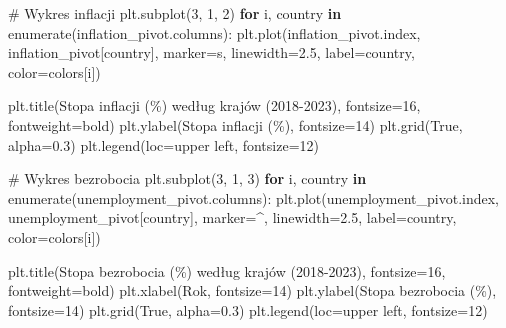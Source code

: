 \documentclass[
  polish,
  letterpaper,
  DIV=11,
  numbers=noendperiod]{scrreprt}
\newenvironment{Shaded}{\begin{snugshade}}{\end{snugshade}}
\newcommand{\BuiltInTok}[1]{\textcolor[rgb]{0.00,0.23,0.31}{#1}}
\newcommand{\CommentTok}[1]{\textcolor[rgb]{0.37,0.37,0.37}{#1}}
\newcommand{\ControlFlowTok}[1]{\textcolor[rgb]{0.00,0.23,0.31}{\textbf{#1}}}
\newcommand{\DecValTok}[1]{\textcolor[rgb]{0.68,0.00,0.00}{#1}}
\newcommand{\FloatTok}[1]{\textcolor[rgb]{0.68,0.00,0.00}{#1}}
\newcommand{\KeywordTok}[1]{\textcolor[rgb]{0.00,0.23,0.31}{\textbf{#1}}}
\newcommand{\NormalTok}[1]{\textcolor[rgb]{0.00,0.23,0.31}{#1}}
\newcommand{\OperatorTok}[1]{\textcolor[rgb]{0.37,0.37,0.37}{#1}}
\newcommand{\StringTok}[1]{\textcolor[rgb]{0.13,0.47,0.30}{#1}}
\newcommand{\VariableTok}[1]{\textcolor[rgb]{0.07,0.07,0.07}{#1}}
\begin{document}
\begin{Shaded}
\begin{Highlighting}[]
\CommentTok{\# Wykres inflacji}
\NormalTok{plt.subplot(}\DecValTok{3}\NormalTok{, }\DecValTok{1}\NormalTok{, }\DecValTok{2}\NormalTok{)}
\ControlFlowTok{for}\NormalTok{ i, country }\KeywordTok{in} \BuiltInTok{enumerate}\NormalTok{(inflation\_pivot.columns):}
\NormalTok{    plt.plot(inflation\_pivot.index, inflation\_pivot[country], marker}\OperatorTok{=}\StringTok{\textquotesingle{}s\textquotesingle{}}\NormalTok{, }
\NormalTok{             linewidth}\OperatorTok{=}\FloatTok{2.5}\NormalTok{, label}\OperatorTok{=}\NormalTok{country, color}\OperatorTok{=}\NormalTok{colors[i])}
    

\NormalTok{plt.title(}\StringTok{\textquotesingle{}Stopa inflacji (\%) według krajów (2018{-}2023)\textquotesingle{}}\NormalTok{, fontsize}\OperatorTok{=}\DecValTok{16}\NormalTok{, fontweight}\OperatorTok{=}\StringTok{\textquotesingle{}bold\textquotesingle{}}\NormalTok{)}
\NormalTok{plt.ylabel(}\StringTok{\textquotesingle{}Stopa inflacji (\%)\textquotesingle{}}\NormalTok{, fontsize}\OperatorTok{=}\DecValTok{14}\NormalTok{)}
\NormalTok{plt.grid(}\VariableTok{True}\NormalTok{, alpha}\OperatorTok{=}\FloatTok{0.3}\NormalTok{)}
\NormalTok{plt.legend(loc}\OperatorTok{=}\StringTok{\textquotesingle{}upper left\textquotesingle{}}\NormalTok{, fontsize}\OperatorTok{=}\DecValTok{12}\NormalTok{)}

\CommentTok{\# Wykres bezrobocia}
\NormalTok{plt.subplot(}\DecValTok{3}\NormalTok{, }\DecValTok{1}\NormalTok{, }\DecValTok{3}\NormalTok{)}
\ControlFlowTok{for}\NormalTok{ i, country }\KeywordTok{in} \BuiltInTok{enumerate}\NormalTok{(unemployment\_pivot.columns):}
\NormalTok{    plt.plot(unemployment\_pivot.index, unemployment\_pivot[country], marker}\OperatorTok{=}\StringTok{\textquotesingle{}\^{}\textquotesingle{}}\NormalTok{, }
\NormalTok{             linewidth}\OperatorTok{=}\FloatTok{2.5}\NormalTok{, label}\OperatorTok{=}\NormalTok{country, color}\OperatorTok{=}\NormalTok{colors[i])}
  

\NormalTok{plt.title(}\StringTok{\textquotesingle{}Stopa bezrobocia (\%) według krajów (2018{-}2023)\textquotesingle{}}\NormalTok{, fontsize}\OperatorTok{=}\DecValTok{16}\NormalTok{, fontweight}\OperatorTok{=}\StringTok{\textquotesingle{}bold\textquotesingle{}}\NormalTok{)}
\NormalTok{plt.xlabel(}\StringTok{\textquotesingle{}Rok\textquotesingle{}}\NormalTok{, fontsize}\OperatorTok{=}\DecValTok{14}\NormalTok{)}
\NormalTok{plt.ylabel(}\StringTok{\textquotesingle{}Stopa bezrobocia (\%)\textquotesingle{}}\NormalTok{, fontsize}\OperatorTok{=}\DecValTok{14}\NormalTok{)}
\NormalTok{plt.grid(}\VariableTok{True}\NormalTok{, alpha}\OperatorTok{=}\FloatTok{0.3}\NormalTok{)}
\NormalTok{plt.legend(loc}\OperatorTok{=}\StringTok{\textquotesingle{}upper left\textquotesingle{}}\NormalTok{, fontsize}\OperatorTok{=}\DecValTok{12}\NormalTok{)}


\end{Highlighting}
\end{Shaded}
\end{document}
